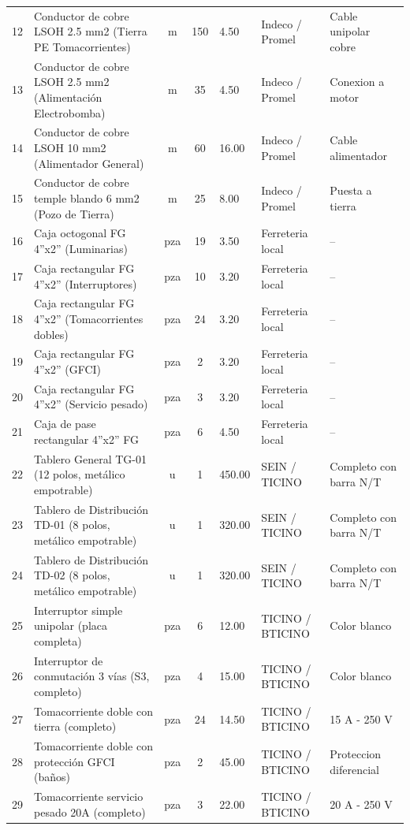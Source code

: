 \begin{longtable}{c L{4.0cm} c c R{1.4cm} L{2.0cm} L{3.5cm}}
12 & Conductor de cobre LSOH 2.5 mm2 (Tierra PE Tomacorrientes) & m & 150 & 4.50 & Indeco / Promel & Cable unipolar cobre \\
13 & Conductor de cobre LSOH 2.5 mm2 (Alimentación Electrobomba) & m & 35 & 4.50 & Indeco / Promel & Conexion a motor \\
14 & Conductor de cobre LSOH 10 mm2 (Alimentador General) & m & 60 & 16.00 & Indeco / Promel & Cable alimentador \\
15 & Conductor de cobre temple blando 6 mm2 (Pozo de Tierra) & m & 25 & 8.00 & Indeco / Promel & Puesta a tierra \\
16 & Caja octogonal FG 4''x2'' (Luminarias) & pza & 19 & 3.50 & Ferreteria local & -- \\
17 & Caja rectangular FG 4''x2'' (Interruptores) & pza & 10 & 3.20 & Ferreteria local & -- \\
18 & Caja rectangular FG 4''x2'' (Tomacorrientes dobles) & pza & 24 & 3.20 & Ferreteria local & -- \\
19 & Caja rectangular FG 4''x2'' (GFCI) & pza & 2 & 3.20 & Ferreteria local & -- \\
20 & Caja rectangular FG 4''x2'' (Servicio pesado) & pza & 3 & 3.20 & Ferreteria local & -- \\
21 & Caja de pase rectangular 4''x2'' FG & pza & 6 & 4.50 & Ferreteria local & -- \\
22 & Tablero General TG-01 (12 polos, metálico empotrable) & u & 1 & 450.00 & SEIN / TICINO & Completo con barra N/T \\
23 & Tablero de Distribución TD-01 (8 polos, metálico empotrable) & u & 1 & 320.00 & SEIN / TICINO & Completo con barra N/T \\
24 & Tablero de Distribución TD-02 (8 polos, metálico empotrable) & u & 1 & 320.00 & SEIN / TICINO & Completo con barra N/T \\
25 & Interruptor simple unipolar (placa completa) & pza & 6 & 12.00 & TICINO / BTICINO & Color blanco \\
26 & Interruptor de conmutación 3 vías (S3, completo) & pza & 4 & 15.00 & TICINO / BTICINO & Color blanco \\
27 & Tomacorriente doble con tierra (completo) & pza & 24 & 14.50 & TICINO / BTICINO & 15 A - 250 V \\
28 & Tomacorriente doble con protección GFCI (baños) & pza & 2 & 45.00 & TICINO / BTICINO & Proteccion diferencial \\
29 & Tomacorriente servicio pesado 20A (completo) & pza & 3 & 22.00 & TICINO / BTICINO & 20 A - 250 V \\

\end{longtable}
